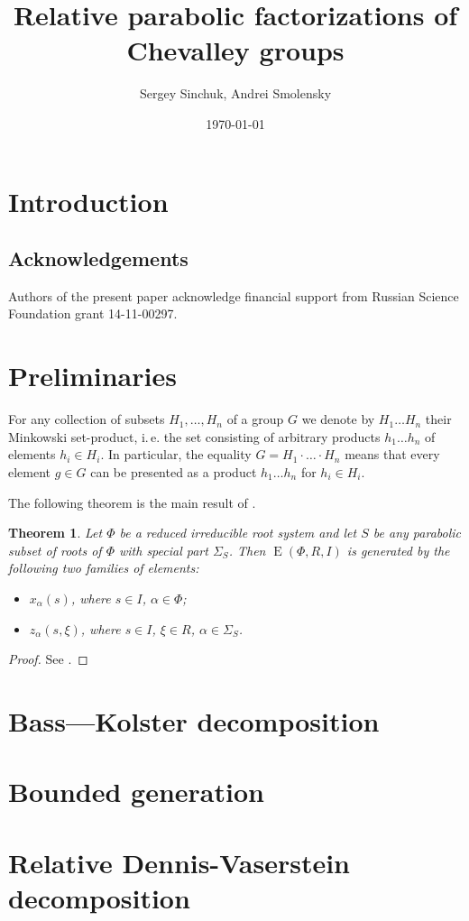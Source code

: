 \documentclass[12pt]{amsart}
\title{Relative parabolic factorizations of Chevalley groups}
\author {Sergey Sinchuk, Andrei Smolensky}
\date {\today}
\numberwithin{equation}{section}
\newcounter{thmcounter} \newcounter{lemmacounter}
\newtheorem{thm}[thmcounter]{Theorem}
\theoremstyle{definition}
\DeclareMathOperator{\E}{E}
\begin{document}
\begin{abstract} \end{abstract}

\maketitle

\section {Introduction}\label{sec:intro}
 
\subsection{Acknowledgements}
Authors of the present paper acknowledge financial support from Russian Science Foundation grant 14-11-00297.

\section {Preliminaries}\label{sec:prelim}
For any collection of subsets $H_1,\ldots, H_n$ of a group $G$ we denote by $H_1\ldots H_n$ their Minkowski set-product,
i.\,e. the set consisting of arbitrary products $h_1\ldots h_n$ of elements $h_i\in H_i$. In particular, the equality
$G = H_1\cdot\ldots\cdot H_n$ means that every element $g\in G$ can be presented as a product $h_1\ldots h_n$ for $h_i\in H_i$.

The following theorem is the main result of \cite{S}.
\begin{thm}\label{theorem:Stepanov}
Let $\Phi$ be a reduced irreducible root system and let $S$ be any parabolic subset of roots of $\Phi$ with special part $\Sigma_S$.
Then $\E(\Phi, R, I)$ is generated by the following two families of elements:
\begin{itemize}
 \item $x_{\alpha}(s)$, where $s\in I$, $\alpha\in\Phi$;
 \item $z_\alpha(s,\xi)$, where $s\in I$, $\xi\in R$, $\alpha\in\Sigma_S$. \end{itemize} \end{thm}
\begin{proof} See \cite[Theorem~3.4]{S}. \end{proof}

\section{Bass---Kolster decomposition}\label{sec:bass-kolster}


\section{Bounded generation}\label{sec:boundgen}


\section{Relative Dennis-Vaserstein decomposition}\label{sec:dennis-vaserstein}


\printbibliography
\end{document}
